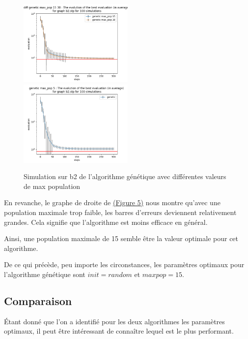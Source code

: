 \documentclass[11pt,french]{report}
\begin{document}
        \begin{figure}
          \includegraphics[width=0.5\textwidth]{best_b2_evaluation_diff genetic max_pop 15 30.png}
          \includegraphics[width=0.5\textwidth]{best_b2_evaluation_genetic max_pop 5.png}
          \caption{Simulation sur b2 de l'algorithme génétique avec différentes valeurs de max population}
          \label{Figure5}
        \end{figure}

        En revanche, le graphe de droite de \hyperref[Figure5]{(Figure 5)} nous montre qu'avec une population maximale trop faible, les barres d'erreurs deviennent relativement grandes. Cela signifie que l'algorithme est moins efficace en général.

        Ainsi, une population maximale de 15 semble être la valeur optimale pour cet algorithme.


        De ce qui précède, peu importe les circonstances, les paramètres optimaux pour l'algorithme génétique sont $init = random$ et $maxpop = 15$.

        \subsection{Comparaison}
        Étant donné que l'on a identifié pour les deux algorithmes les paramètres optimaux, il peut être intéressant de connaître lequel est le plus performant.
\end{document}
